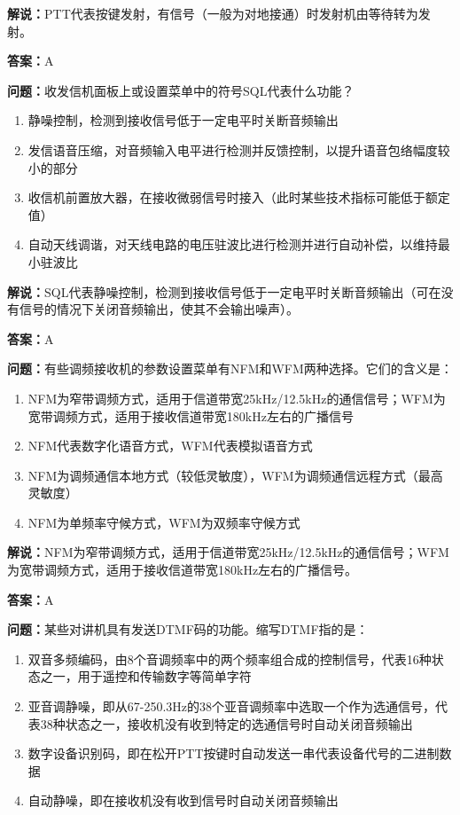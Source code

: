 \documentclass[UTF8]{ctexbook}
\begin{document}
\textbf{解说：}PTT代表按键发射，有信号（一般为对地接通）时发射机由等待转为发射。%

\textbf{答案：}A

\textbf{问题：}收发信机面板上或设置菜单中的符号SQL代表什么功能？

\begin{enumerate}[label=\Alph*), leftmargin=3em]
  \item 静噪控制，检测到接收信号低于一定电平时关断音频输出
  \item 发信语音压缩，对音频输入电平进行检测并反馈控制，以提升语音包络幅度较小的部分
  \item 收信机前置放大器，在接收微弱信号时接入（此时某些技术指标可能低于额定值）
  \item 自动天线调谐，对天线电路的电压驻波比进行检测并进行自动补偿，以维持最小驻波比
\end{enumerate}

\textbf{解说：}SQL代表静噪控制，检测到接收信号低于一定电平时关断音频输出（可在没有信号的情况下关闭音频输出，使其不会输出噪声）。%

\textbf{答案：}A

\textbf{问题：}有些调频接收机的参数设置菜单有NFM和WFM两种选择。它们的含义是：

\begin{enumerate}[label=\Alph*), leftmargin=3em]
  \item NFM为窄带调频方式，适用于信道带宽25kHz/12.5kHz的通信信号；WFM为宽带调频方式，适用于接收信道带宽180kHz左右的广播信号
  \item NFM代表数字化语音方式，WFM代表模拟语音方式
  \item NFM为调频通信本地方式（较低灵敏度），WFM为调频通信远程方式（最高灵敏度）
  \item NFM为单频率守候方式，WFM为双频率守候方式
\end{enumerate}

\textbf{解说：}NFM为窄带调频方式，适用于信道带宽25kHz/12.5kHz的通信信号；WFM为宽带调频方式，适用于接收信道带宽180kHz左右的广播信号。%

\textbf{答案：}A

\textbf{问题：}某些对讲机具有发送DTMF码的功能。缩写DTMF指的是：

\begin{enumerate}[label=\Alph*), leftmargin=3em]
  \item 双音多频编码，由8个音调频率中的两个频率组合成的控制信号，代表16种状态之一，用于遥控和传输数字等简单字符
  \item 亚音调静噪，即从67-250.3Hz的38个亚音调频率中选取一个作为选通信号，代表38种状态之一，接收机没有收到特定的选通信号时自动关闭音频输出
  \item 数字设备识别码，即在松开PTT按键时自动发送一串代表设备代号的二进制数据
  \item 自动静噪，即在接收机没有收到信号时自动关闭音频输出
\end{enumerate}
\end{document}
